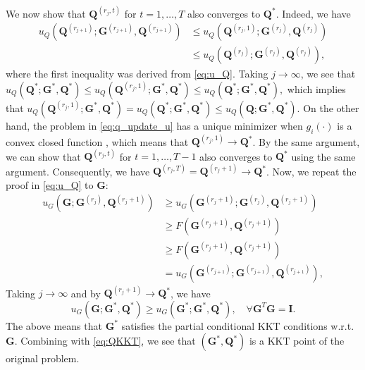 \documentclass[10pt,journal]{IEEEtran}
\newcommand{\G}{\boldsymbol{G}}
\newcommand{\Q}{\boldsymbol{Q}}
\begin{document}
We now show that $\Q^{(r_j,t)}$ for $t=1,\ldots,T$ also converges to $\Q^\ast$.
Indeed, we have
\begin{align*}
u_Q(\Q^{(r_{j+1})};\G^{(r_{j+1})},\Q^{(r_{j+1})})&\leq u_Q(\Q^{(r_j,1)};\G^{(r_j)},\Q^{(r_j)})\\
&\leq u_Q(\Q^{(r_j)};\G^{(r_j)},\Q^{(r_j)}) ,
\end{align*}
where the first inequality was derived from \eqref{eq:u_Q}.
Taking $j\rightarrow \infty$, we see that
$ u_Q(\Q^{\ast};\G^{\ast},\Q^{\ast})\leq u_Q(\Q^{(r_j,1)};\G^{\ast},\Q^{\ast})\leq u_Q(\Q^{\ast};\G^{\ast},\Q^{\ast}) , $
which implies that
$u_Q(\Q^{(r_j,1)};\G^{\ast},\Q^{\ast})= u_Q(\Q^{\ast};\G^{\ast},\Q^{\ast})\leq u_Q(\Q;\G^{\ast},\Q^{\ast}).$
On the other hand, the problem in \eqref{eq:q_update_u} has a unique minimizer when $g_i(\cdot)$ is a convex closed function \cite{parikh2013proximal},
which means that $\Q^{(r_j,1)}\rightarrow \Q^{\ast}$. By the same argument, we can show that
$\Q^{(r_j,t)}$ for $t=1,\ldots,T-1$ also converges to $\Q^\ast$ using the same argument.
Consequently, we have
$\Q^{(r_j,T)} = \Q^{(r_j+1)} \rightarrow \Q^\ast$. 
Now, we repeat the proof in \eqref{eq:u_Q} to ${\bm G}$:
\begin{subequations}\label{eq:u_G}
\begin{align*}
         u_G\left({\bm G};{\bm G}^{(r_j)},{\bm Q}^{(r_j+1)}\right) &\geq u_G\left({\bm G}^{(r_j+1)};{\bm G}^{(r_j)},{\bm Q}^{(r_j+1)}\right) \\
				                              &\geq F({\bm G}^{(r_j+1)},{\bm Q}^{(r_j+1)})\\					
                                               &\geq F\left({\bm G}^{(r_j+1)},{\bm Q}^{(r_j+1)}\right)  \\
											   & = u_G\left({\bm G}^{(r_{j+1})};{\bm G}^{(r_{j+1})},{\bm Q}^{(r_{j+1})}\right), 
\end{align*}
\end{subequations}
Taking $j\rightarrow \infty$ and by $\Q^{(r_j+1)} \rightarrow \Q^\ast$, we have
\[ u_G\left({\bm G};{\bm G}^{\ast},{\bm Q}^{\ast}\right) \geq u_G\left({\bm G}^{\ast};{\bm G}^{\ast},{\bm Q}^{\ast}\right),\quad \forall \G^T\G={\bm I}. \]
The above means that $\G^\ast$ satisfies the partial conditional KKT conditions w.r.t. $\G$.
Combining with \eqref{eq:QKKT}, we see that $({\bm G}^\ast,{\bm Q}^\ast)$ is a KKT point of the original problem. 
\end{document}
